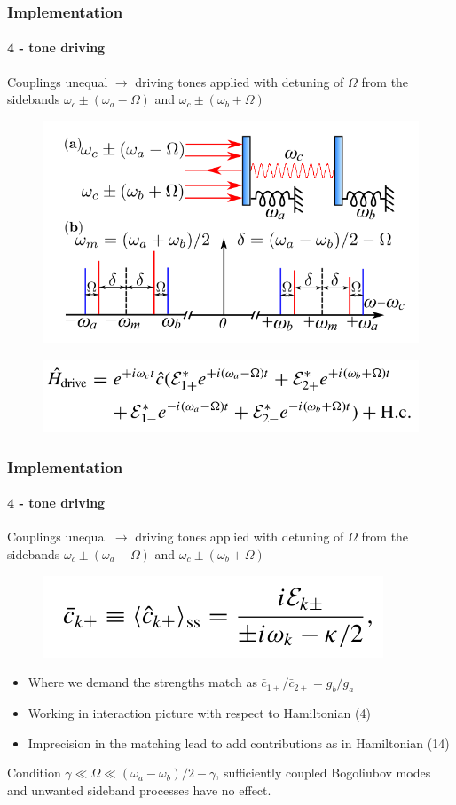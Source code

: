 \documentclass[aspectratio=43]{beamer}
\begin{document}
\begin{frame}
	
	\frametitle{Implementation}
	\framesubtitle{4 - tone driving}
	
	Couplings unequal $\longrightarrow$ driving tones applied with detuning of $\Omega$ from the sidebands $\omega_{c} \pm (\omega_{a} - \Omega)$ and $\omega_{c} \pm (\omega_{b} + \Omega)$
	
	\begin{figure}
		\includegraphics[width = 7 cm]{plots/plot_4_tone.png}
	\end{figure}	
	
	\begin{figure}
		\includegraphics[width = 8 cm]{plots/hamiltonian_4_tone.png}
	\end{figure}

\end{frame}

\begin{frame}
	
	\frametitle{Implementation}
	\framesubtitle{4 - tone driving}
	
	Couplings unequal $\longrightarrow$ driving tones applied with detuning of $\Omega$ from the sidebands $\omega_{c} \pm (\omega_{a} - \Omega)$ and $\omega_{c} \pm (\omega_{b} + \Omega)$
	
	\begin{figure}
		\includegraphics[width = 5 cm]{plots/ss_4_tone.png}
	\end{figure}

	\begin{itemize}
		\item Where we demand the strengths match as $\bar{c}_{1\pm} / \bar{c}_{2\pm} = g_{b} / g_{a}$
		\item Working in interaction picture with respect to Hamiltonian (4)
		\item Imprecision in the matching lead to add contributions as in Hamiltonian (14)
	\end{itemize}

	Condition $\gamma \ll \Omega \ll (\omega_{a} - \omega_{b})/2 - \gamma$, {\color{blue}sufficiently coupled} Bogoliubov modes and unwanted sideband processes have no effect.

\end{frame}
\end{document}
